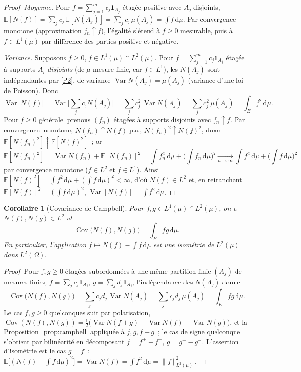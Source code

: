\documentclass[11pt,a4paper]{article}
\theoremstyle{plain}
\newtheorem{corollaire}[theoreme]{Corollaire}
\theoremstyle{definition}
\newcommand{\E}{\mathbb{E}}
\newcommand{\Var}{\operatorname{Var}}
\newcommand{\Cov}{\operatorname{Cov}}
\newcommand{\one}{\mathbf{1}}
\newcommand{\dd}{\,\mathrm{d}}
\begin{document}
\begin{proof}
\emph{Moyenne.} Pour $f=\sum_{j=1}^m c_j\one_{A_j}$ étagée positive avec $A_j$ disjoints,
$\E[N(f)]=\sum_j c_j\,\E[N(A_j)]=\sum_j c_j\,\mu(A_j)=\int f\dd\mu$. Par convergence monotone (approximation $f_n\uparrow f$), l'égalité s'étend à $f\ge0$ mesurable, puis à $f\in L^1(\mu)$ par différence des parties positive et négative.

\emph{Variance.} Supposons $f\ge0$, $f\in L^1(\mu)\cap L^2(\mu)$. Pour $f=\sum_{j=1}^m c_j\one_{A_j}$ étagée à supports $A_j$ \emph{disjoints} (de $\mu$-mesure finie, car $f\in L^1$), les $N(A_j)$ sont indépendantes par \ref{P2}, de variance $\Var N(A_j)=\mu(A_j)$ (variance d'une loi de Poisson). Donc
\[
\Var\big[N(f)\big]=\Var\Big[\sum_j c_j N(A_j)\Big]=\sum_j c_j^2\,\Var N(A_j)=\sum_j c_j^2\,\mu(A_j)=\int_E f^2\dd\mu.
\]
Pour $f\ge0$ générale, prenons $(f_n)$ étagées à supports disjoints avec $f_n\uparrow f$. Par convergence monotone, $N(f_n)\uparrow N(f)$ p.s., $N(f_n)^2\uparrow N(f)^2$, donc $\E[N(f_n)^2]\uparrow\E[N(f)^2]$~; or
\[
\E[N(f_n)^2]=\Var N(f_n)+\E[N(f_n)]^2=\int f_n^2\dd\mu+\Big(\int f_n\dd\mu\Big)^2
\xrightarrow[n\to\infty]{}\int f^2\dd\mu+\Big(\int f\dd\mu\Big)^2
\]
par convergence monotone ($f\in L^2$ et $f\in L^1$). Ainsi $\E[N(f)^2]=\int f^2\dd\mu+(\int f\dd\mu)^2<\infty$, d'où $N(f)\in L^2$ et, en retranchant $\E[N(f)]^2=(\int f\dd\mu)^2$, $\Var[N(f)]=\int f^2\dd\mu$.
\end{proof}

\begin{corollaire}[Covariance de Campbell]\label{cor:cov}
Pour $f,g\in L^1(\mu)\cap L^2(\mu)$, on a $N(f),N(g)\in L^2$ et
\[
\Cov\big(N(f),N(g)\big)=\int_E fg\dd\mu.
\]
En particulier, l'application $f\mapsto N(f)-\int f\dd\mu$ est une isométrie de $L^2(\mu)$ dans $L^2(\Omega)$.
\end{corollaire}

\begin{proof}
Pour $f,g\ge0$ étagées subordonnées à une même partition finie $(A_j)$ de mesures finies, $f=\sum_j c_j\one_{A_j}$, $g=\sum_j d_j\one_{A_j}$, l'indépendance des $N(A_j)$ donne
\[
\Cov\big(N(f),N(g)\big)=\sum_j c_j d_j\,\Var N(A_j)=\sum_j c_j d_j\,\mu(A_j)=\int_E fg\dd\mu.
\]
Le cas $f,g\ge0$ quelconques suit par polarisation, $\Cov(N(f),N(g))=\tfrac12\big(\Var N(f+g)-\Var N(f)-\Var N(g)\big)$, et la Proposition~\ref{prop:campbell} appliquée à $f,g,f+g$~; le cas de signe quelconque s'obtient par bilinéarité en décomposant $f=f^+-f^-$, $g=g^+-g^-$. L'assertion d'isométrie est le cas $g=f$~: $\E\big[(N(f)-\int f\dd\mu)^2\big]=\Var N(f)=\int f^2\dd\mu=\|f\|_{L^2(\mu)}^2$.
\end{proof}
\end{document}
